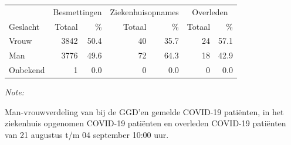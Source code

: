 \documentclass[
  english,
  man,floatsintext]{apa6}
\begin{document}
\begin{table}[H]
\centering\begingroup\fontsize{11}{13}\selectfont

\begin{threeparttable}
\begin{tabular}{lrrrrrr}
\toprule
\multicolumn{1}{c}{ } & \multicolumn{2}{c}{Besmettingen} & \multicolumn{2}{c}{Ziekenhuisopnames} & \multicolumn{2}{c}{Overleden} \\
\cmidrule(l{3pt}r{3pt}){2-3} \cmidrule(l{3pt}r{3pt}){4-5} \cmidrule(l{3pt}r{3pt}){6-7}
Geslacht & Totaal & \% & Totaal & \% & Totaal & \%\\
\midrule
Vrouw & 3842 & 50.4 & 40 & 35.7 & 24 & 57.1\\
Man & 3776 & 49.6 & 72 & 64.3 & 18 & 42.9\\
Onbekend & 1 & 0.0 & 0 & 0.0 & 0 & 0.0\\
\bottomrule
\end{tabular}
\begin{tablenotes}
\item \textit{Note: } 
\item Man-vrouwverdeling van bij de GGD’en gemelde COVID-19 patiënten, in het ziekenhuis opgenomen COVID-19 patiënten en overleden COVID-19 patiënten van 21 augustus t/m 04 september 10:00 uur.
\end{tablenotes}
\end{threeparttable}
\endgroup{}
\end{table}
\newpage
\end{document}
